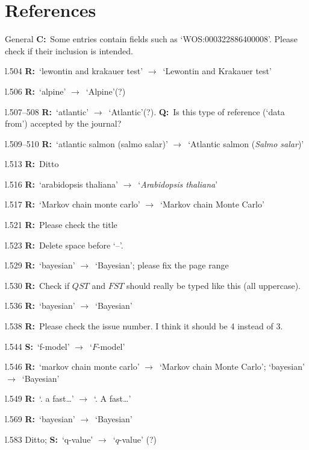 \documentclass[11pt]{article}
\newenvironment{my_description}
{\begin{description}
  \setlength{\itemsep}{2pt}
  \setlength{\parskip}{0pt}
  \setlength{\parsep}{0pt}}
{\end{description}}
\newcommand{\ra}{$\rightarrow$\ }
\newcommand{\C}{\textbf{C:}\ }
\newcommand{\Q}{\textbf{Q:}\ }
\newcommand{\R}{\textbf{R:}\ }
\newcommand{\V}{\textbf{S:}\ }
\begin{document}
\section{References}
\begin{my_description}
	\item[General] \C Some entries contain fields such as `WOS:000322886400008'. Please check if their inclusion is intended.
	\item[l.504] \R `lewontin and krakauer test' \ra `Lewontin and Krakauer test'
	\item[l.506] \R `alpine' \ra `Alpine'(?)
	\item[l.507--508] \R `atlantic' \ra `Atlantic'(?). \Q Is this type of reference (`data from') accepted by the journal?
	\item[l.509--510] \R `atlantic salmon (salmo salar)' \ra `Atlantic salmon (\emph{Salmo salar})'
	\item[l.513] \R Ditto
	\item[l.516] \R `arabidopsis thaliana' \ra `\emph{Arabidopsis thaliana}'
	\item[l.517] \R `Markov chain monte carlo' \ra `Markov chain Monte Carlo'
	\item[l.521] \R Please check the title
	\item[l.523] \R Delete space before `--'.
	\item[l.529] \R `bayesian' \ra `Bayesian'; please fix the page range
	\item[l.530] \R Check if $QST$ and $FST$ should really be typed like this (all uppercase).
	\item[l.536] \R `bayesian' \ra `Bayesian'
	\item[l.538] \R Please check the issue number. I think it should be 4 instead of 3.
	\item[l.544] \V `f-model' \ra `$F$-model'
	\item[l.546] \R `markov chain monte carlo' \ra `Markov chain Monte Carlo'; `bayesian' \ra `Bayesian'
	\item[l.549] \R `. a fast\dots' \ra `. A fast\dots'
	\item[l.569] \R `bayesian' \ra `Bayesian'
	\item[l.583] Ditto; \V `q-value' \ra `$q$-value' (?)
	
\end{my_description}

\end{document}
